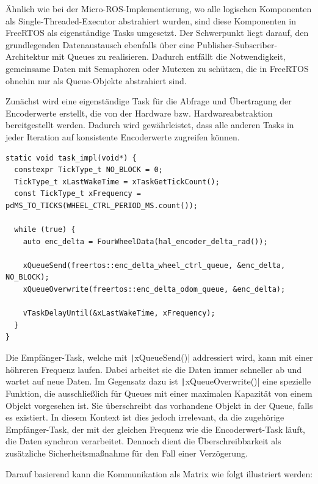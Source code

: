 Ähnlich wie bei der Micro-ROS-Implementierung, wo alle logischen Komponenten als
Single-Threaded-Executor abstrahiert wurden, sind diese Komponenten in FreeRTOS
als eigenständige Tasks umgesetzt. Der Schwerpunkt liegt darauf, den
grundlegenden Datenaustausch ebenfalls über eine
Publisher-Subscriber-Architektur mit Queues zu realisieren. Dadurch entfällt die
Notwendigkeit, gemeinsame Daten mit Semaphoren oder Mutexen zu schützen, die in
FreeRTOS ohnehin nur als Queue-Objekte abstrahiert sind.

Zunächst wird eine eigenständige Task für die Abfrage und Übertragung der
Encoderwerte erstellt, die von der Hardware bzw. Hardwareabstraktion
bereitgestellt werden. Dadurch wird gewährleistet, dass alle anderen Tasks in
jeder Iteration auf konsistente Encoderwerte zugreifen können.

\begin{code}
\begin{verbatim}
static void task_impl(void*) {
  constexpr TickType_t NO_BLOCK = 0;
  TickType_t xLastWakeTime = xTaskGetTickCount();
  const TickType_t xFrequency = pdMS_TO_TICKS(WHEEL_CTRL_PERIOD_MS.count());

  while (true) {
    auto enc_delta = FourWheelData(hal_encoder_delta_rad());

    xQueueSend(freertos::enc_delta_wheel_ctrl_queue, &enc_delta, NO_BLOCK);
    xQueueOverwrite(freertos::enc_delta_odom_queue, &enc_delta);

    vTaskDelayUntil(&xLastWakeTime, xFrequency);
  }
}
\end{verbatim}
\end{code}


Die Empfänger-Task, welche mit \texttt|xQueueSend()| addressiert wird,
kann mit einer höhreren Frequenz laufen. Dabei arbeitet sie die Daten immer
schneller ab und wartet auf neue Daten. Im Gegensatz dazu ist
\texttt|xQueueOverwrite()| eine spezielle Funktion, die ausschließlich
für Queues mit einer maximalen Kapazität von einem Objekt vorgesehen ist. Sie
überschreibt das vorhandene Objekt in der Queue, falls es existiert. In diesem
Kontext ist dies jedoch irrelevant, da die zugehörige Empfänger-Task, der mit
der gleichen Frequenz wie die Encoderwert-Task läuft, die Daten synchron
verarbeitet. Dennoch dient die Überschreibbarkeit als zusätzliche
Sicherheitsmaßnahme für den Fall einer Verzögerung.

Darauf basierend kann die Kommunikation als Matrix wie folgt illustriert werden:

